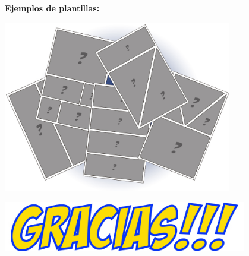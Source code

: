 \documentclass[utf8]{beamer}
\begin{document}
	\begin{frame}
		\textbf{
			\newline
			\newline
			\color{red}\hspace{1cm}\huge Ejemplos de plantillas:
		}
		\begin{center} 
			\includegraphics[width=0.75\textwidth]{plantillas.jpg}
		\end{center}
	\end{frame}
	\begin{frame}
		\begin{center} 
			 \includegraphics[width=0.8\textwidth]{gracias.jpg}
		\end{center}
	\end{frame}
\end{document}
